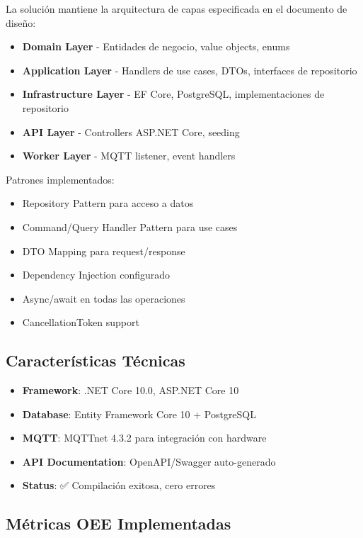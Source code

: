 La solución mantiene la arquitectura de capas especificada en el documento de diseño:

\begin{itemize}
    \item \textbf{Domain Layer} - Entidades de negocio, value objects, enums
    \item \textbf{Application Layer} - Handlers de use cases, DTOs, interfaces de repositorio
    \item \textbf{Infrastructure Layer} - EF Core, PostgreSQL, implementaciones de repositorio
    \item \textbf{API Layer} - Controllers ASP.NET Core, seeding
    \item \textbf{Worker Layer} - MQTT listener, event handlers
\end{itemize}

Patrones implementados:

\begin{itemize}
    \item Repository Pattern para acceso a datos
    \item Command/Query Handler Pattern para use cases
    \item DTO Mapping para request/response
    \item Dependency Injection configurado
    \item Async/await en todas las operaciones
    \item CancellationToken support
\end{itemize}

\subsection{Características Técnicas}

\begin{itemize}
    \item \textbf{Framework}: .NET Core 10.0, ASP.NET Core 10
    \item \textbf{Database}: Entity Framework Core 10 + PostgreSQL
    \item \textbf{MQTT}: MQTTnet 4.3.2 para integración con hardware
    \item \textbf{API Documentation}: OpenAPI/Swagger auto-generado
    \item \textbf{Status}: ✅ Compilación exitosa, cero errores
\end{itemize}

\subsection{Métricas OEE Implementadas}

